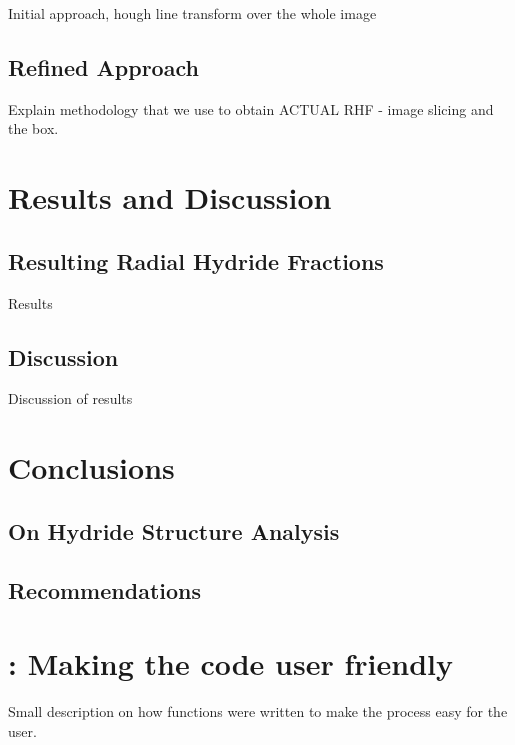 \documentclass{article}
\begin{document}

Initial approach, hough line transform over the whole image

\subsection{Refined Approach}
Explain methodology that we use to obtain ACTUAL RHF - image slicing and the box.

\section{Results and Discussion}
\subsection{Resulting Radial Hydride Fractions}
Results

\subsection{Discussion}
Discussion of results

\section{Conclusions}
\subsection{On Hydride Structure Analysis}

\subsection{Recommendations}

\newpage



\newpage
\appendix
\section{: Making the code user friendly}
Small description on how functions were written to make the process easy for the user.
\end{document}

